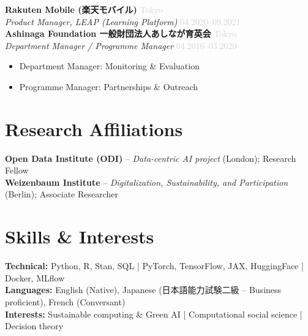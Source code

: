 \documentclass[11pt,a4paper]{article}
\newcommand{\jp}[1]{{\japanesefont #1}}
\newcommand{\entry}[4]{%
    \textbf{#1} \hfill \textcolor{lightgray}{#2}\\
    \textit{#3} \hfill \textcolor{lightgray}{#4}\\[0.3em]
}
\begin{document}
\vspace{0.5em}
\entry{Rakuten Mobile \jp{(楽天モバイル)}}{Tokyo}{Product Manager, LEAP (Learning Platform)}{04.2020--09.2021}

\vspace{0.5em}
\entry{Ashinaga Foundation \jp{一般財団法人あしなが育英会}}{Tokyo}{Department Manager / Programme Manager}{04.2016--03.2020}
\begin{itemize}
    \item Department Manager: Monitoring \& Evaluation
    \item Programme Manager: Partnerships \& Outreach
\end{itemize}

\section{Research Affiliations}

\textbf{Open Data Institute (ODI)} -- \textit{Data-centric AI project} (London); Research Fellow\\
\textbf{Weizenbaum Institute} -- \textit{Digitalization, Sustainability, and Participation} (Berlin); Associate Researcher

\section{Skills \& Interests}

\textbf{Technical:} Python, R, Stan, SQL | PyTorch, TensorFlow, JAX, HuggingFace | Docker, MLflow\\
\textbf{Languages:} English (Native), Japanese (\jp{日本語能力試験二級} -- Business proficient), French (Conversant)\\
\textbf{Interests:} Sustainable computing \& Green AI | Computational social science | Decision theory
\end{document}
